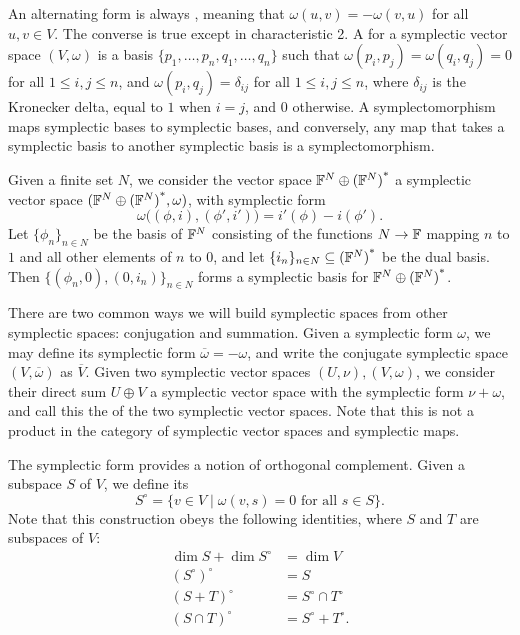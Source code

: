 An alternating form is always , meaning that $\omega(u,v) = 
-\omega(v,u)$ for all $u,v \in V$.  The converse is true except in characteristic 2.
A  for a symplectic vector space $(V,\omega)$ is a
basis $\{p_1,\dots,p_n,q_1,\dots,q_n\}$ such that $\omega(p_i,p_j) =
\omega(q_i,q_j) = 0$ for all $1 \le i,j \le n$, and $\omega(p_i,q_j) =
\delta_{ij}$ for all $1 \le i,j\le n$, where $\delta_{ij}$ is the Kronecker delta,
equal to $1$ when $i =j$, and $0$ otherwise. A symplectomorphism maps symplectic
bases to symplectic bases, and conversely, any map that takes a symplectic basis
to another symplectic basis is a symplectomorphism.

\begin{example}
  \label{ex:symplectic_space_generated_by_set}
  Given a finite set $N$, we consider the vector space ${{\mathbb F}^{N} \oplus {({\mathbb F}^{N})}^\ast}$ a symplectic
  vector space $({{\mathbb F}^{N} \oplus {({\mathbb F}^{N})}^\ast},\omega)$, with symplectic form 
  \[
    \omega\big((\phi,i),(\phi',i')\big) = i'(\phi)-i(\phi').  
  \] 
  Let $\{\phi_n\}_{n \in N}$ be the basis of ${\mathbb F}^N$ consisting of the functions
  $N \to {\mathbb F}$ mapping $n$ to $1$ and all other elements of $n$ to $0$, and let
  $\{i_n\}_{n \in N} \subseteq {({\mathbb F}^N)}^\ast$ be the dual basis. Then
  $\{(\phi_n,0),(0,i_n)\}_{n\in N}$ forms a symplectic basis for ${{\mathbb F}^{N} \oplus {({\mathbb F}^{N})}^\ast}$.  
\end{example}

There are two common ways we will build symplectic spaces from other
symplectic spaces: conjugation and summation. Given a symplectic form $\omega$,
we may define its  symplectic form $\overline\omega = -
\omega$, and write the conjugate symplectic space $(V,\overline\omega)$ as
$\overline V$. Given two symplectic vector spaces $(U, \nu),(V,\omega)$, we
consider their direct sum $U \oplus V$ a symplectic vector space with the
symplectic form $\nu+\omega$, and call this the  of the two
symplectic vector spaces. Note that this is not a product in the category of
symplectic vector spaces and symplectic maps.

The symplectic form provides a notion of orthogonal complement.  Given a subspace $S$ of $V$, we define its 
\[
  S^\circ = \{v \in V \mid \omega(v,s) = 0 \textrm{ for all } s \in S\}.
\]
Note that this construction obeys the following identities, where $S$ and $T$
are subspaces of $V$:
\begin{align*}
  \dim S+ \dim S^\circ &= \dim V \\
  (S^\circ)^\circ &= S \\
  (S + T)^\circ &= S^\circ \cap T^\circ \\
  (S \cap T)^\circ &= S^\circ + T^\circ.
\end{align*}

